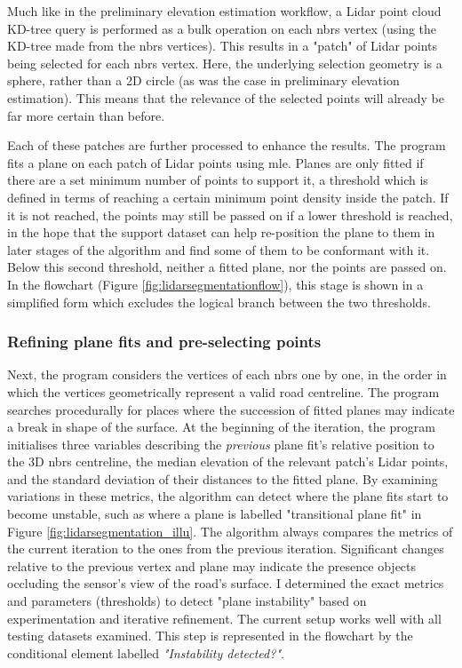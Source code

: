 Much like in the preliminary elevation estimation workflow, a Lidar point cloud KD-tree query is performed as a bulk operation on each \ac{nbrs} vertex (using the KD-tree made from the \ac{nbrs} vertices). This results in a "patch" of Lidar points being selected for each \ac{nbrs} vertex. Here, the underlying selection geometry is a sphere, rather than a 2D circle (as was the case in preliminary elevation estimation). This means that the relevance of the selected points will already be far more certain than before.

Each of these patches are further processed to enhance the results. The program fits a plane on each patch of Lidar points using \ac{mle}. Planes are only fitted if there are a set minimum number of points to support it, a threshold which is defined in terms of reaching a certain minimum point density inside the patch. If it is not reached, the points may still be passed on if a lower threshold is reached, in the hope that the support dataset can help re-position the plane to them in later stages of the algorithm and find some of them to be conformant with it. Below this second threshold, neither a fitted plane, nor the points are passed on. In the flowchart (Figure \ref{fig:lidarsegmentationflow}), this stage is shown in a simplified form which excludes the logical branch between the two thresholds.

\subsubsection{Refining plane fits and pre-selecting points}

Next, the program considers the vertices of each \ac{nbrs} one by one, in the order in which the vertices geometrically represent a valid road centreline. The program searches procedurally for places where the succession of fitted planes may indicate a break in shape of the surface. At the beginning of the iteration, the program initialises three variables describing the \textit{previous} plane fit's relative position to the 3D \ac{nbrs} centreline, the median elevation of the relevant patch's Lidar points, and the standard deviation of their distances to the fitted plane. By examining variations in these metrics, the algorithm can detect where the plane fits start to become unstable, such as where a plane is labelled "transitional plane fit" in Figure \ref{fig:lidarsegmentation_illu}. The algorithm always compares the metrics of the current iteration to the ones from the previous iteration. Significant changes relative to the previous vertex and plane may indicate the presence objects occluding the sensor's view of the road's surface. I determined the exact metrics and parameters (thresholds) to detect "plane instability" based on experimentation and iterative refinement. The current setup works well with all testing datasets examined. This step is represented in the flowchart by the conditional element labelled \textit{"Instability detected?"}.

